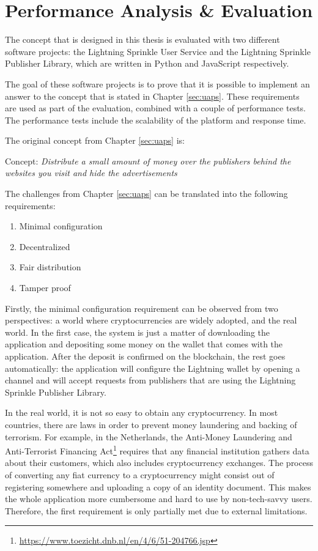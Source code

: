 \chapter{Performance Analysis \& Evaluation}
\label{cha:evaluation}

The concept that is designed in this thesis is evaluated with two different software projects: the Lightning Sprinkle User Service and the Lightning Sprinkle Publisher Library, which are written in Python and JavaScript respectively. 

The goal of these software projects is to prove that it is possible to implement an answer to the concept that is stated in Chapter \ref{sec:uaps}. These requirements are used as part of the evaluation, combined with a couple of performance tests. The performance tests include the scalability of the platform and response time. 

\noindent The original concept from Chapter \ref{sec:uaps} is:

\vspace{1em}

Concept: \textit{Distribute a small amount of money over the publishers behind the websites you visit and hide the advertisements}

\vspace{1em}

\noindent The challenges from Chapter \ref{sec:uaps} can be translated into the following requirements:
\begin{enumerate}
  \item Minimal configuration
  \item Decentralized
  \item Fair distribution
  \item Tamper proof
\end{enumerate}

Firstly, the minimal configuration requirement can be observed from two perspectives: a world where cryptocurrencies are widely adopted, and the real world. In the first case, the system is just a matter of downloading the application and depositing some money on the wallet that comes with the application. After the deposit is confirmed on the blockchain, the rest goes automatically: the application will configure the Lightning wallet by opening a channel and will accept requests from publishers that are using the Lightning Sprinkle Publisher Library. 

In the real world, it is not so easy to obtain any cryptocurrency. In most countries, there are laws in order to prevent money laundering and backing of terrorism. For example, in the Netherlands, the Anti-Money Laundering and Anti-Terrorist Financing Act\footnote{\url{https://www.toezicht.dnb.nl/en/4/6/51-204766.jsp}} requires that any financial institution gathers data about their customers, which also includes cryptocurrency exchanges. The process of converting any fiat currency to a cryptocurrency might consist out of registering somewhere and uploading a copy of an identity document. This makes the whole application more cumbersome and hard to use by non-tech-savvy users. Therefore, the first requirement is only partially met due to external limitations.


